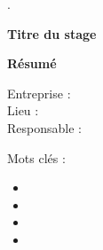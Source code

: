 \begin{titlepage}.
    

    \vspace{3cm}

    \begin{Large}
        \begin{center}
            \textbf{Titre du stage}
        \end{center}
        \makeatletter
        \noindent\@title
        \makeatother
    \end{Large}

    \vspace{0.5cm}

    \begin{large}
        \begin{center}
            \textbf{Résumé}
        \end{center}

        \makeatletter
        \@abstracttext
        \makeatother
    \end{large}

    \vspace{1.5cm}

    \begin{multicols}{2}
        \begin{Large}
            \noindent Entreprise : \makeatletter \@companyname \makeatother\\
            Lieu : \makeatletter \@companyplace \makeatother\\
            Responsable : \makeatletter \@companytutor \makeatother

            \columnbreak

            Mots clés :
            \begin{itemize}
                \item \makeatletter \@keywordone \makeatother
                \item \makeatletter \@keywordtwo \makeatother
                \item \makeatletter \@keywordthree \makeatother
                \item \makeatletter \@keywordfour \makeatother
            \end{itemize}
        \end{Large}
    \end{multicols}
\end{titlepage}